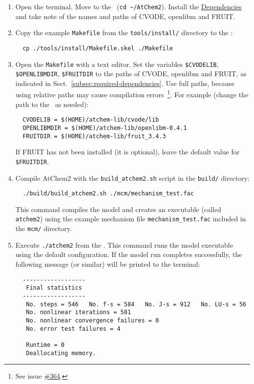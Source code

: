 \begin{enumerate}
\item Open the terminal. Move to the \maindir\ (\verb|cd ~/AtChem2|).
  Install the \hyperref[sec:dependencies]{Dependencies} and take note
  of the names and paths of CVODE, openlibm and FRUIT.
\item Copy the example \texttt{Makefile} from the
  \texttt{tools/install/} directory to the \maindir:
  \begin{verbatim}
  cp ./tools/install/Makefile.skel ./Makefile
  \end{verbatim}
\item Open the \texttt{Makefile} with a text editor. Set the variables
  \texttt{\$CVODELIB}, \texttt{\$OPENLIBMDIR}, \texttt{\$FRUITDIR} to
  the paths of CVODE, openlibm and FRUIT, as indicated in
  Sect.~\ref{subsec:required-dependencies}. Use full paths, because
  using relative paths may cause compilation errors~\footnote{See
    issue \href{https://github.com/AtChem/AtChem2/issues/364}{\#364}.}.
  For example (change the path to the \depdir\ as needed):
  \begin{verbatim}
  CVODELIB = $(HOME)/atchem-lib/cvode/lib
  OPENLIBMDIR = $(HOME)/atchem-lib/openlibm-0.4.1
  FRUITDIR = $(HOME)/atchem-lib/fruit_3.4.3
  \end{verbatim}
  If FRUIT has not been installed (it is optional), leave the default
  value for \texttt{\$FRUITDIR}.
\item Compile AtChem2 with the \texttt{build\_atchem2.sh} script in
  the \texttt{build/} directory:
  \begin{verbatim}
  ./build/build_atchem2.sh ./mcm/mechanism_test.fac
  \end{verbatim}
  This command compiles the model and creates an executable (called
  \texttt{atchem2}) using the example mechanism file
  \texttt{mechanism\_test.fac} included in the \texttt{mcm/}
  directory.
\item Execute \verb|./atchem2| from the \maindir. This command runs
  the model executable using the default configuration. If the model
  run completes successfully, the following message (or similar) will
  be printed to the terminal:
  \begin{verbatim}
  ------------------
   Final statistics
  ------------------
   No. steps = 546   No. f-s = 584   No. J-s = 912   No. LU-s = 56
   No. nonlinear iterations = 581
   No. nonlinear convergence failures = 0
   No. error test failures = 4

   Runtime = 0
   Deallocating memory.
  \end{verbatim}
\end{enumerate}

